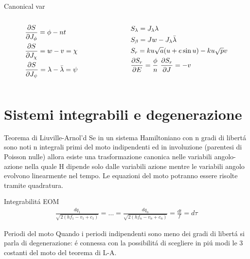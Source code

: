 \begin{wordonframe}{Canonical var}
\begin{columns}\begin{column}{0.5\textwidth}
\begin{align*}
&\PDy{J_{\phi}}{S}=\phi-nt\\
&\PDy{J_{\chi}}{S}=w-v=\chi\\
&\PDy{J_{\psi}}{S}=\lambda-\bar{\lambda}=\psi
\end{align*}
\end{column}\begin{column}{0.5\textwidth}
\begin{align*}
&S_{\lambda}=J_{\lambda}\lambda\\
&S_{\beta}=Jw-J_{\lambda}\bar{\lambda}\\
&S_r=ku\sqrt{a}(u+e\sin{u})-ku\sqrt{p}v\\
&\PDy{E}{S_r}=\frac{\phi}{n} \ \PDy{J}{S_r}=-v
\end{align*}
\end{column}\end{columns}
\end{wordonframe}


\section{Sistemi integrabili e degenerazione}

\begin{frame}{Teorema di Liuville-Arnol'd}
Se in un sistema Hamiltoniano con n gradi di libert\'a sono noti n integrali primi del moto indipendenti ed in involuzione (parentesi di Poisson nulle) allora esiste una trasformazione canonica nelle variabili angolo-azione nella quale H dipende solo dalle variabili azione mentre le variabili angolo evolvono linearmente nel tempo. Le equazioni del moto potranno essere risolte tramite quadratura.
\end{frame}

\begin{wordonframe}{Integrabilit\'a EOM}
\begin{align*}
\frac{dq_1}{\sqrt{2(hf_1-v_1+c_1)}}=\ldots=\frac{dq_n}{\sqrt{2(hf_n-v_n+c_n)}}=\frac{dt}{f}=d\tau
\end{align*}
\end{wordonframe}

\begin{frame}{Periodi del moto}
Quando i periodi indipendenti sono meno dei gradi di libert\'a si parla di degenerazione: \'e connessa con la possibilit\'a di scegliere in pi\'u modi le 3 costanti del moto del teorema di L-A.
\end{frame}
